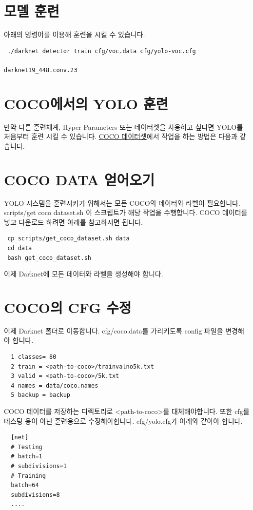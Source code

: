\documentclass{article}
\begin{document}
\section{모델 훈련}
아래의 명령어를 이용해 훈련을 시킬 수 있습니다.
\begin{lstlisting}
 ./darknet detector train cfg/voc.data cfg/yolo-voc.cfg 
                                                      darknet19_448.conv.23 
\end{lstlisting}

\section{COCO에서의 YOLO 훈련}
만약 다른 훈련체계, Hyper-Parameters 또는 데이터셋을 사용하고 싶다면 YOLO를 처음부터 훈련 시킬 수 있습니다. 
\href{http://cocodataset.org}{COCO 데이터셋}에서 작업을 하는 방법은 다음과 같습니다.

\section{COCO DATA 얻어오기}
YOLO 시스템을 훈련시키기 위해서는 모든 COCO의 데이터와 라벨이 필요합니다. 
scripts/get coco dataset.sh 이 스크립트가 해당 작업을 수행합니다. 
COCO 데이터를 넣고 다운로드 하려면 아래를 참고하시면 됩니다.
\begin{lstlisting}
 cp scripts/get_coco_dataset.sh data 
 cd data 
 bash get_coco_dataset.sh 
\end{lstlisting}
이제 Darknet에 모든 데이터와 라벨을 생성해야 합니다.

\section{COCO의 CFG 수정}
이제 Darknet 폴더로 이동합니다. 
cfg/coco.data를 가리키도록 config 파일을 변경해야 합니다.
\begin{lstlisting}
  1 classes= 80 
  2 train = <path-to-coco>/trainvalno5k.txt 
  3 valid = <path-to-coco>/5k.txt 
  4 names = data/coco.names 
  5 backup = backup 
\end{lstlisting}
COCO 데이터를 저장하는 디렉토리로 <path-to-coco>를 대체해야합니다.
또한 cfg를 테스팅 용이 아닌 훈련용으로 수정해야합니다. 
cfg/yolo.cfg가 아래와 같아야 합니다.
\begin{lstlisting}
  [net] 
  # Testing 
  # batch=1 
  # subdivisions=1 
  # Training 
  batch=64 
  subdivisions=8 
  .... 
\end{lstlisting}
\end{document}
